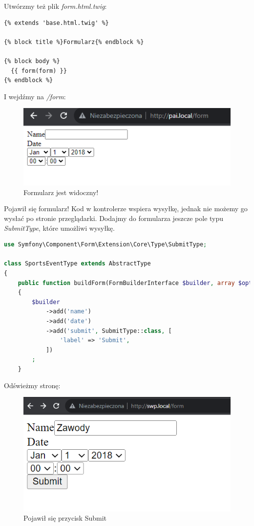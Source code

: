 \documentclass[polish, a4paper]{article}
\begin{document}
Utwórzmy też plik \emph{form.html.twig}:

\begin{lstlisting}
{% extends 'base.html.twig' %}

{% block title %}Formularz{% endblock %}

{% block body %}
  {{ form(form) }}
{% endblock %}
\end{lstlisting}

I wejdźmy na \emph{/form}:

\begin{figure}[H]
  \centering
  \includegraphics[width=\textwidth]{form.png}
  \caption{Formularz jest widoczny!}
\end{figure}

Pojawił się formularz! Kod w kontrolerze wspiera wysyłkę, jednak nie możemy go wysłać po stronie przeglądarki. Dodajmy do formularza jeszcze pole typu \emph{SubmitType}, które umożliwi wysyłkę.

\begin{lstlisting}[language=PHP]
use Symfony\Component\Form\Extension\Core\Type\SubmitType;

class SportsEventType extends AbstractType
{
    public function buildForm(FormBuilderInterface $builder, array $options): void
    {
        $builder
            ->add('name')
            ->add('date')
            ->add('submit', SubmitType::class, [
                'label' => 'Submit',
            ])
        ;
    }
\end{lstlisting}

Odświeżmy stronę:

\begin{figure}[H]
  \centering
  \includegraphics[width=\textwidth]{submit.png}
  \caption{Pojawił się przycisk Submit}
\end{figure}
\end{document}
